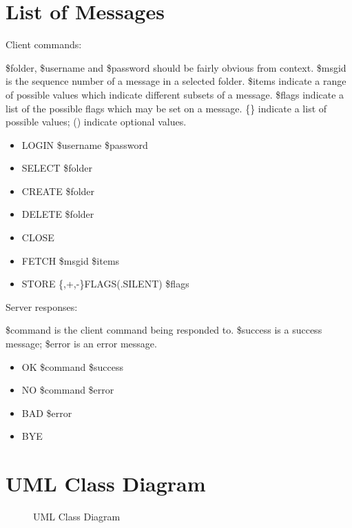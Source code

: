 \documentclass[a4paper,12pt]{article}
\begin{document}
\section*{List of Messages}

Client commands:

\$folder, \$username and \$password should be fairly obvious from context. \$msgid is the sequence number of a message in a selected folder. \$items indicate a range of possible values which indicate different subsets of a message. \$flags indicate a list of the possible flags which may be set on a message. \{\} indicate a list of possible values; () indicate optional values.

\begin{itemize}
\item LOGIN \$username \$password
\item SELECT \$folder
\item CREATE \$folder
\item DELETE \$folder
\item CLOSE
\item FETCH \$msgid \$items
\item STORE \{,+,-\}FLAGS(.SILENT) \$flags
\end{itemize}

Server responses:

\$command is the client command being responded to. \$success is a success message; \$error is an error message.

\begin{itemize}
\item OK \$command \$success
\item NO \$command \$error
\item BAD \$error
\item BYE
\end{itemize}

\section*{UML Class Diagram}

\begin{figure}[h]
    \centering
    
    \caption{UML Class Diagram}
\end{figure}
\end{document}
